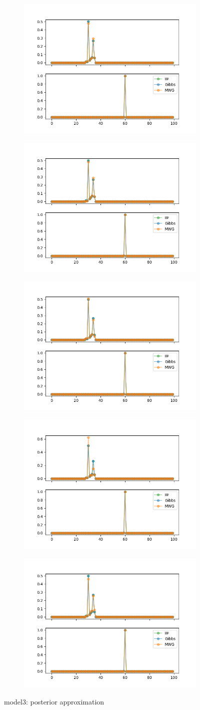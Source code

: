 \begin{figure}[H]
    \centering
    \begin{subfigure}
    	\centering
        \includegraphics[width=0.3\linewidth]{../../plots/Posterior_post_burnin_M3_N100_NMCMC3_seed0_diffind2.png}
    \end{subfigure}
    \begin{subfigure}
        \centering
    	\includegraphics[width=0.3\linewidth]{../../plots/Posterior_post_burnin_M3_N100_NMCMC3_seed1_diffind2.png}
	\end{subfigure}
	\begin{subfigure}
	    \centering
    	\includegraphics[width=0.3\linewidth]{../../plots/Posterior_post_burnin_M3_N100_NMCMC3_seed2_diffind2.png}
	\end{subfigure}
	\begin{subfigure}
	    \centering
    	\includegraphics[width=0.3\linewidth]{../../plots/Posterior_post_burnin_M3_N100_NMCMC3_seed3_diffind2.png}
	\end{subfigure}
	\begin{subfigure}
	    \centering
    	\includegraphics[width=0.3\linewidth]{../../plots/Posterior_post_burnin_M3_N100_NMCMC3_seed4_diffind2.png}
	\end{subfigure}
	\caption{model3: posterior approximation}
\end{figure}

